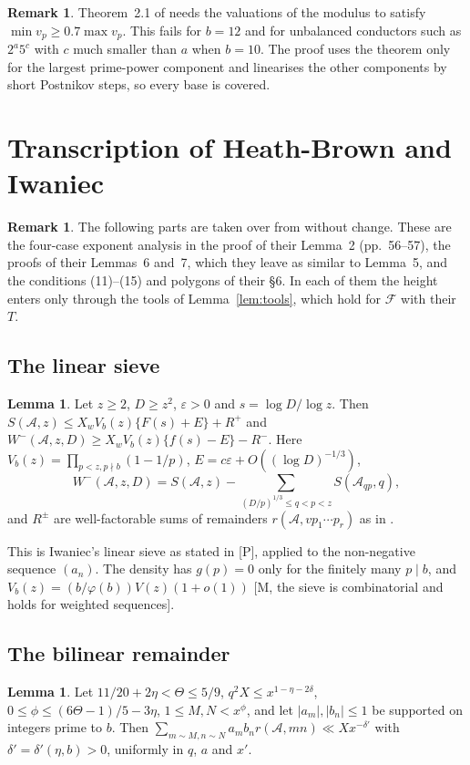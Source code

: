 \documentclass[11pt]{amsart}
\makeatletter
\theoremstyle{definition}
\newtheorem{lemma}[theorem]{Lemma}
\newtheorem{remark}[theorem]{Remark}
\numberwithin{equation}{section}
\renewenvironment{proof}[1][\proofname]{\par\pushQED{\qed}\normalfont\topsep6\p@\@plus6\p@\relax\trivlist\item[\hskip\labelsep\upshape#1.]\ignorespaces}{\popQED\endtrivlist\@endpefalse}
\newcommand{\cA}{\mathcal{A}}
\newcommand{\cF}{\mathcal{F}}
\makeatother
\begin{document}
\begin{remark}
Theorem~2.1 of \cite{BS} needs the valuations of the modulus to satisfy $\min v_p\ge0.7\max v_p$. This fails for $b=12$ and for unbalanced conductors such as $2^a5^c$ with $c$ much smaller than $a$ when $b=10$. The proof uses the theorem only for the largest prime-power component and linearises the other components by short Postnikov steps, so every base is covered.
\end{remark}

\section{Transcription of Heath-Brown and Iwaniec}\label{sec:hbi}

\begin{remark}\label{rem:verbatim}
The following parts are taken over from \cite{HBI} without change. These are the four-case exponent analysis in the proof of their Lemma~2 (pp.~56--57), the proofs of their Lemmas~6 and~7, which they leave as similar to Lemma~5, and the conditions (11)--(15) and polygons of their \S6. In each of them the height enters only through the tools of Lemma~\ref{lem:tools}, which hold for $\cF$ with their $T$.
\end{remark}

\subsection{The linear sieve}
\begin{lemma}\label{lem:sieve}
Let $z\ge2$, $D\ge z^2$, $\varepsilon>0$ and $s=\log D/\log z$. Then $S(\cA,z)\le X_wV_b(z)\{F(s)+E\}+R^+$ and $W^-(\cA,z,D)\ge X_wV_b(z)\{f(s)-E\}-R^-$. Here $V_b(z)=\prod_{p<z,p\nmid b}(1-1/p)$, $E=c\varepsilon+O((\log D)^{-1/3})$,
\[
W^-(\cA,z,D)=S(\cA,z)-\sum_{(D/p)^{1/3}\le q<p<z}S(\cA_{qp},q),
\]
and $R^\pm$ are well-factorable sums of remainders $r(\cA,vp_1\cdots p_r)$ as in \cite[(5)]{HBI}.
\end{lemma}

\begin{proof}
This is Iwaniec's linear sieve as stated in \cite[Lemma~1]{HBI} [P], applied to the non-negative sequence $(a_n)$. The density has $g(p)=0$ only for the finitely many $p\mid b$, and $V_b(z)=(b/\varphi(b))V(z)(1+o(1))$ [M, the sieve is combinatorial and holds for weighted sequences].
\end{proof}

\subsection{The bilinear remainder}
\begin{lemma}\label{lem:bilinear}
Let $11/20+2\eta<\Theta\le5/9$, $q^2X\le x^{1-\eta-2\delta}$, $0\le\phi\le(6\Theta-1)/5-3\eta$, $1\le M,N<x^\phi$, and let $|a_m|,|b_n|\le1$ be supported on integers prime to $b$. Then $\sum_{m\sim M,n\sim N}a_mb_nr(\cA,mn)\ll Xx^{-\delta'}$ with $\delta'=\delta'(\eta,b)>0$, uniformly in $q$, $a$ and $x'$.
\end{lemma}
\end{document}
